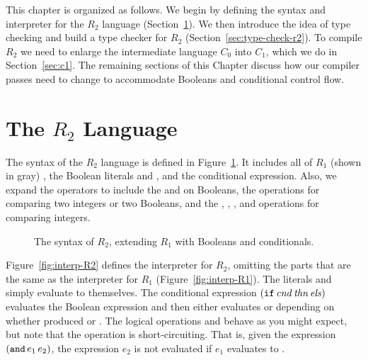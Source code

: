 \documentclass[11pt]{book}
\newcommand{\gray}[1]{{\color{lightgray} #1}}
\begin{document}
This chapter is organized as follows.  We begin by defining the syntax
and interpreter for the $R_2$ language (Section~\ref{sec:r2-lang}). We
then introduce the idea of type checking and build a type checker for
$R_2$ (Section~\ref{sec:type-check-r2}). To compile $R_2$ we need to
enlarge the intermediate language $C_0$ into $C_1$, which we do in
Section~\ref{sec:c1}. The remaining sections of this Chapter discuss
how our compiler passes need to change to accommodate Booleans and
conditional control flow.


\section{The $R_2$ Language}
\label{sec:r2-lang}

The syntax of the $R_2$ language is defined in
Figure~\ref{fig:r2-syntax}. It includes all of $R_1$ (shown in gray) ,
the Boolean literals  and , and the conditional
 expression. Also, we expand the operators to include the
 and  on Booleans, the   operations for
comparing two integers or two Booleans, and the \key{<}, \key{<=},
\key{>}, and \key{>=} operations for comparing integers.

\begin{figure}[tp]
\centering
\fbox{
\begin{minipage}{0.96\textwidth}
\[
\begin{array}{lcl}
  \itm{cmp} &::= & \key{eq?} \mid \key{<} \mid \key{<=} \mid \key{>} \mid \key{>=} \\
  \Exp &::=& \gray{\Int \mid (\key{read}) \mid (\key{-}\;\Exp) \mid (\key{+} \; \Exp\;\Exp)}  \\
     &\mid&  \gray{\Var \mid \LET{\Var}{\Exp}{\Exp}} \\
     &\mid& \key{\#t} \mid \key{\#f} \mid
      (\key{and}\;\Exp\;\Exp) \mid (\key{not}\;\Exp) \\
      &\mid& (\itm{cmp}\;\Exp\;\Exp) \mid \IF{\Exp}{\Exp}{\Exp} \\
  R_2 &::=& (\key{program} \; \Exp)
\end{array}
\]
\end{minipage}
}
\caption{The syntax of $R_2$, extending $R_1$ with Booleans and
  conditionals.}
\label{fig:r2-syntax}
\end{figure}

Figure~\ref{fig:interp-R2} defines the interpreter for $R_2$, omitting
the parts that are the same as the interpreter for $R_1$
(Figure~\ref{fig:interp-R1}). The literals  and 
simply evaluate to themselves. The conditional expression $(\texttt{if}\,
\mathit{cnd}\,\mathit{thn}\,\mathit{els})$ evaluates the Boolean expression
 and then either evaluates  or  depending
on whether  produced  or . The logical
operations  and  behave as you might expect, but
note that the  operation is short-circuiting. That is, given
the expression $(\texttt{and}\,e_1\,e_2)$, the expression $e_2$ is not
evaluated if $e_1$ evaluates to .
\end{document}

